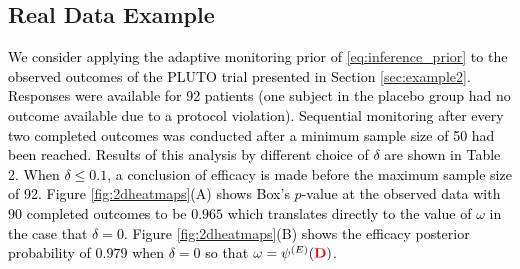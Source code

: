 \documentclass[12pt]{article}
\begin{document}




\subsection{Real Data Example}\label{sec:realdataexample}
\textcolor{black}{
We consider applying the adaptive monitoring prior of \eqref{eq:inference_prior} to the observed outcomes of the PLUTO trial presented in Section \ref{sec:example2}. %
Responses were available for 92 patients (one subject in the placebo group had no outcome available due to a protocol violation). Sequential monitoring after every two completed outcomes was conducted after a minimum sample size of 50 had been reached. Results of this analysis by different choice of $\delta$ are shown in Table 2. When $\delta\leq 0.1$, a conclusion of efficacy is made before the maximum sample size of 92. Figure \ref{fig:2dheatmaps}(A) shows Box's $p$-value at the observed data with $90$ completed outcomes to be $0.965$ which translates directly to the value of $\omega$ in the case that $\delta=0$. Figure \ref{fig:2dheatmaps}(B) shows the efficacy posterior probability of $0.979$ when $\delta=0$ so that $\omega=\psi^{(E)}(\textcolor{red}{\mathbf{D}})$.} 
\end{document}
